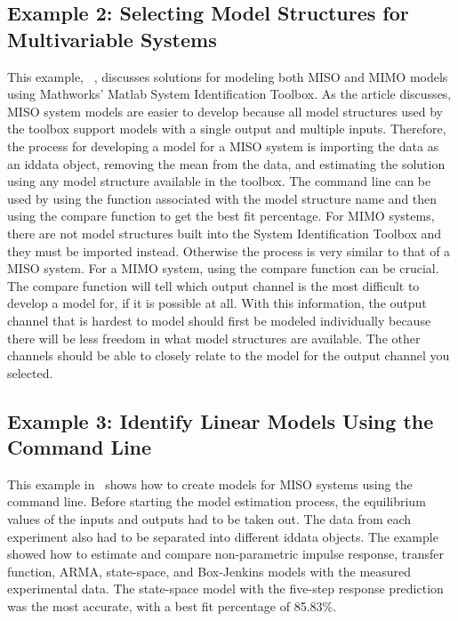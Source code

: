 \documentclass[letterpaper,12pt]{article}   %
\begin{document}
\subsection{Example 2: Selecting Model Structures for Multivariable Systems}
\label{sec:sysID-Example2}
This example, ~\cite{Matlab2}, discusses solutions for modeling both MISO and MIMO models using Mathworks' Matlab System Identification Toolbox. As the article discusses, MISO system models are easier to develop because all model structures used by the toolbox support models with a single output and multiple inputs. Therefore, the process for developing a model for a MISO system is importing the data as an iddata object, removing the mean from the data, and estimating the solution using any model structure available in the toolbox. The command line can be used by using the function associated with the model structure name and then using the compare function to get the best fit percentage. For MIMO systems, there are not model structures built into the System Identification Toolbox and they must be imported instead. Otherwise the process is very similar to that of a MISO system. For a MIMO system, using the compare function can be crucial. The compare function will tell which output channel is the most difficult to develop a model for, if it is possible at all. With this information, the output channel that is hardest to model should first be modeled individually because there will be less freedom in what model structures are available. The other channels should be able to closely relate to the model for the output channel you selected.


\subsection{Example 3: Identify Linear Models Using the Command Line}
\label{sec:sysID-Example3}
This example in~\cite{example3} shows how to create models for MISO systems using the command line. Before starting the model estimation process, the equilibrium values of the inputs and outputs had to be taken out. The data from each experiment also had to be separated into different iddata objects. The example showed how to estimate and compare non-parametric impulse response, transfer function, ARMA, state-space, and Box-Jenkins models with the measured experimental data. The state-space model with the five-step response prediction was the most accurate, with a best fit percentage of 85.83\%. 
\end{document}
